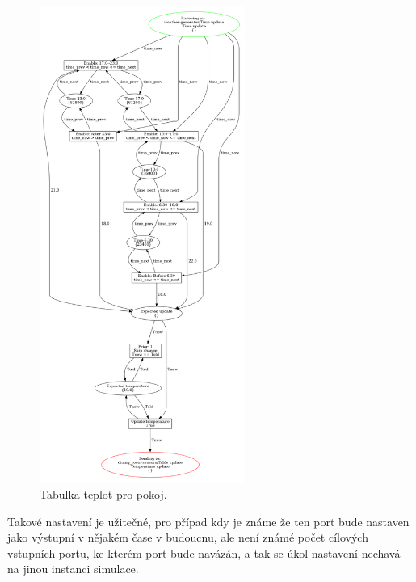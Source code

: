 \begin{figure}[htb]
  \centering
  \includegraphics[width=0.6\textwidth]{obrazky-figures/room-timetable.png}
  \caption{Tabulka teplot pro pokoj.}
  \label{room-table-viz}
\end{figure}
 Takové nastavení je užitečné, pro případ kdy je známe že ten port bude nastaven jako výstupní v nějakém čase v budoucnu, ale není známé počet cílových vstupních portu, ke kterém port bude navázán, a tak se úkol nastavení nechavá na jinou instanci simulace.
